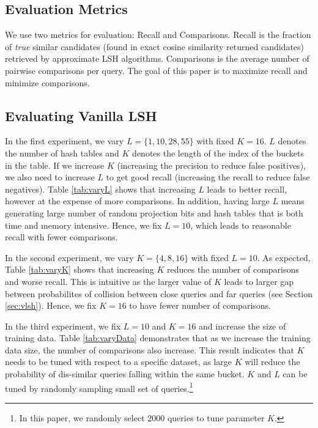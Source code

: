 \subsection{Evaluation Metrics}
We use two metrics for evaluation: Recall and Comparisons. 
Recall is the fraction of \emph{true} similar candidates (found in exact cosine similarity returned candidates) 
retrieved by approximate LSH algorithms.  
Comparisons is the average number of pairwise comparisons per query. 
The goal of this paper is to maximize recall and minimize comparisons.

\subsection{Evaluating Vanilla LSH} 
\label{subsec:eval:vanillaLSH}
In the first experiment, we vary $L=\{1,10,28,55\}$ with fixed $K=16$. 
$L$ denotes the number of hash tables and $K$ denotes the length of the index of the buckets in the table. 
If we increase $K$ (increasing the precision to reduce false positives), we also need to 
increase $L$ to get good recall (increasing the recall to reduce false negatives). 
Table \ref{tab:varyL} shows that increasing $L$ leads to better recall, 
however at the expense of more comparisons. In addition, having large $L$ 
means generating large number of random projection bits and hash tables that is 
both time and memory intensive. Hence, we fix $L=10$, 
which leads to reasonable recall with fewer comparisons. 

In the second experiment, we vary $K=\{4,8,16\}$ with fixed $L=10$. 
As expected, Table \ref{tab:varyK} shows that increasing $K$ reduces the number of 
comparisons and worse recall. This is intuitive as  
the larger value of $K$ leads to larger 
gap between probabilites of collision between close queries 
and far queries (see Section \ref{sec:vlsh}). 
Hence, we fix $K=16$ to have fewer number of comparisons.   

In the third experiment, we fix $L=10$ and $K=16$ and increase the size of training data. 
Table \ref{tab:varyData} demonstrates that as we increase the training data size, 
the number of comparisons also increase. This result indicates that $K$   
needs to be tuned with respect to a specific dataset, 
as large $K$ will reduce the probability of dis-similar 
queries falling within the same bucket. 
$K$ and $L$ can be tuned by 
randomly sampling small set of queries.\footnote{In this paper, we randomly select 2000 queries to tune parameter $K$.}

